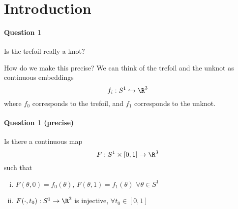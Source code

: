 \documentclass{article}
\begin{document}
\maketitle
\section{Introduction}

\paragraph{Question 1} Is the trefoil really a knot?

How do we make this precise?
We can think of the trefoil and the unknot as continuous embeddings
\begin{equation*}
    f_i: S^1 \hookrightarrow \R^3
\end{equation*}
where $f_0$ corresponds to the trefoil, and $f_1$ corresponds to the unknot.

\paragraph{Question 1 (precise)} Is there a continuous map
\begin{equation*}
    F:S^1 \times [0, 1] \to \R^3
\end{equation*}
such that
\begin{enumerate}[(i)]
    \item $F(\theta, 0) = f_0(\theta)$, $F(\theta, 1) = f_1(\theta)$ $\forall \theta \in S^1$
    \item $F(\cdot, t_0): S^1 \to \R^3$ is injective, $\forall t_0 \in [0, 1]$
\end{enumerate}
\end{document}
